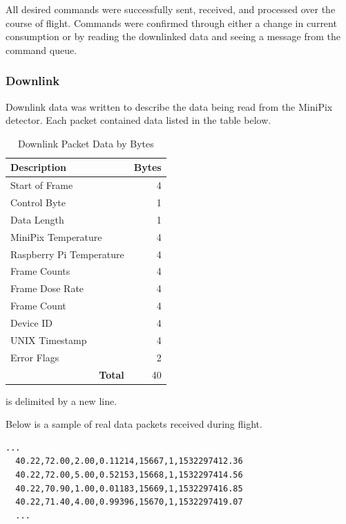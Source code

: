 All desired commands were successfully sent, received, and processed over the course of flight. Commands were confirmed through either 
a change in current consumption or by reading the downlinked data and seeing a message from the command queue. 

\subsubsection{Downlink}
\label{sec:Downlink}
Downlink data was written to describe the data being read from the MiniPix detector. Each packet contained data listed in the table below. 

\begin{table}[H]
\centering
\caption{Downlink Packet Data by Bytes}
\label{tab:packets}
\bigskip
\begin{tabular}{l|r}
\hline
\hline
\bf{Description}					& \bf{Bytes}	\\
\hline
Start of Frame 						& 	4 \\
\hline
Control Byte 						& 	1 \\
\hline
Data Length 						& 	1 \\
\hline
MiniPix Temperature 				&	4 \\
\hline
Raspberry Pi Temperature 			& 	4 \\
\hline
Frame Counts 						& 	4 \\
\hline
Frame Dose Rate 					& 	4 \\
\hline
Frame Count 						& 	4 \\
\hline
Device ID 							& 	4 \\
\hline
UNIX Timestamp 						& 	4 \\
\hline
Error Flags							&	2 \\
\hline
\multicolumn{1}{r|}{\bf{Total}}   	& 	40  \\
\hline
\end{tabular}
\end{table}
is delimited by a new line. 



Below is a sample of real data packets received during flight. 

\lstset{basicstyle=\small, numbers=left, xleftmargin=2em, frame=tb, label = Downlinks, framexleftmargin=1.5em}
\begin{lstlisting}[caption = Sample of downlinked data packets ID: 15667 - 15670]
  ...
  40.22,72.00,2.00,0.11214,15667,1,1532297412.36
  40.22,72.00,5.00,0.52153,15668,1,1532297414.56
  40.22,70.90,1.00,0.01183,15669,1,1532297416.85
  40.22,71.40,4.00,0.99396,15670,1,1532297419.07
  ...
\end{lstlisting}